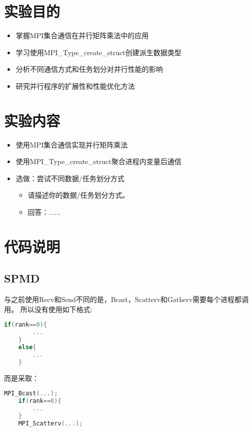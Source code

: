 \documentclass{SYSUReport}
\date{2025年4月2日}
\begin{document}
\cover
\thispagestyle{empty} %
\clearpage

\setcounter{page}{1}


\section{实验目的}
\begin{itemize}
    \item 掌握MPI集合通信在并行矩阵乘法中的应用
    \item 学习使用MPI\_Type\_create\_struct创建派生数据类型
    \item 分析不同通信方式和任务划分对并行性能的影响
    \item 研究并行程序的扩展性和性能优化方法
\end{itemize}

\section{实验内容}
\begin{itemize}
    \item 使用MPI集合通信实现并行矩阵乘法
    \item 使用MPI\_Type\_create\_struct聚合进程内变量后通信
    \item 选做：尝试不同数据/任务划分方式
    \begin{itemize}
        \item 请描述你的数据/任务划分方式。
        \item 回答：......
    \end{itemize}
\end{itemize}

\section{代码说明}
\subsection{SPMD}
与之前使用Recv和Send不同的是，Bcast，Scatterv和Gatherv需要每个进程都调用。
所以没有使用如下格式:
\begin{lstlisting}[language=c++]
    if(rank==0){
        ...
    }
    else{
        ...
    }
\end{lstlisting}
而是采取：
\begin{lstlisting}[language=c++]
    MPI_Bcast(...);
    if(rank==0){
        ...
    }
    MPI_Scatterv(...);
\end{lstlisting}
\end{document}
